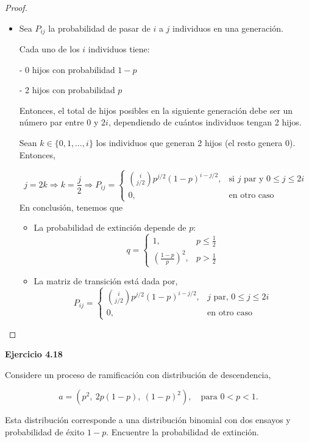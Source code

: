 \documentclass{article}
\begin{document}
\begin{proof}
\begin{itemize}
\item[(b)]
Sea \( P_{ij} \) la probabilidad de pasar de \( i \) a \( j \) individuos en una generación.

Cada uno de los \( i \) individuos tiene:

- 0 hijos con probabilidad \( 1 - p \)

- 2 hijos con probabilidad \( p \)

Entonces, el total de hijos posibles en la siguiente generación debe ser un número par entre 0 y \( 2i \), dependiendo de cuántos individuos tengan 2 hijos.

Sean \( k \in \{0, 1, \dots, i\} \) los individuos que generan 2 hijos (el resto genera 0). Entonces,

\[
j = 2k \Rightarrow k = \frac{j}{2}
\Rightarrow P_{ij} =
\begin{cases}
\binom{i}{j/2} p^{j/2} (1 - p)^{i - j/2}, & \text{si } j \text{ par y } 0 \leq j \leq 2i \\
0, & \text{en otro caso}
\end{cases}
\]
En conclusión, tenemos que
\begin{itemize}
    \item[(a)] La probabilidad de extinción depende de \( p \):
    \[
    q =
    \begin{cases}
    1, & p \leq \frac{1}{2} \\
    \left( \frac{1 - p}{p} \right)^2, & p > \frac{1}{2}
    \end{cases}
    \]
    \item[(b)] La matriz de transición está dada por,
    \[
    P_{ij} =
    \begin{cases}
    \binom{i}{j/2} p^{j/2} (1 - p)^{i - j/2}, & j \text{ par, } 0 \leq j \leq 2i \\
    0, & \text{en otro caso}
    \end{cases}
    \]
\end{itemize}
\end{itemize}
\end{proof}

\textbf{Ejercicio 4.18}

Considere un proceso de ramificación con distribución de descendencia,

\[
a = (p^2,\ 2p(1 - p),\ (1 - p)^2), \quad \text{para } 0 < p < 1.
\]

Esta distribución corresponde a una distribución binomial con dos ensayos y probabilidad de éxito \( 1 - p \). Encuentre la probabilidad de extinción.
\end{document}

